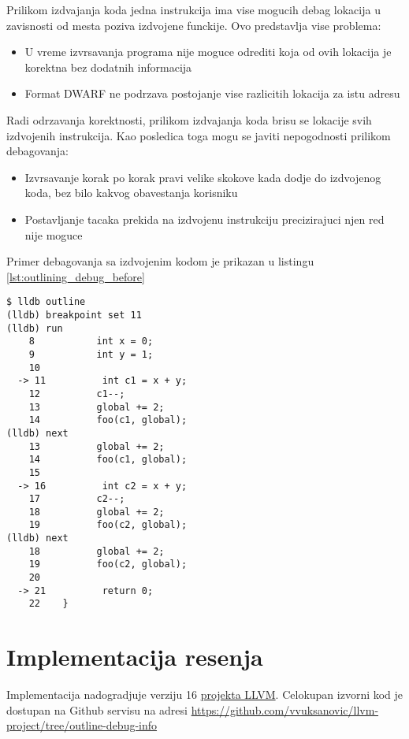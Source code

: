 \documentclass[12pt,oneside]{memoir}
\begin{document}
Prilikom izdvajanja koda jedna instrukcija ima vise mogucih debag lokacija u zavisnosti od mesta poziva izdvojene funckije.
Ovo predstavlja vise problema:
\begin{itemize}
  \item U vreme izvrsavanja programa nije moguce odrediti koja od ovih lokacija je korektna bez dodatnih informacija
  \item Format DWARF ne podrzava postojanje vise razlicitih lokacija za istu adresu \cite{dwarf5}
\end{itemize}
Radi odrzavanja korektnosti, prilikom izdvajanja koda brisu se lokacije svih izdvojenih instrukcija.
Kao posledica toga mogu se javiti nepogodnosti prilikom debagovanja:
\begin{itemize}
  \item Izvrsavanje korak po korak pravi velike skokove kada dodje do izdvojenog koda, bez bilo kakvog obavestanja korisniku
  \item Postavljanje tacaka prekida na izdvojenu instrukciju precizirajuci njen red nije moguce
\end{itemize}

Primer debagovanja sa izdvojenim kodom je prikazan u listingu \ref{lst:outlining_debug_before}

\begin{listing}
\begin{verbatim}
$ lldb outline
(lldb) breakpoint set 11
(lldb) run
    8           int x = 0;
    9           int y = 1;
    10          
  -> 11          int c1 = x + y;
    12          c1--;
    13          global += 2;
    14          foo(c1, global);
(lldb) next
    13          global += 2;
    14          foo(c1, global);
    15          
  -> 16          int c2 = x + y;
    17          c2--;
    18          global += 2;
    19          foo(c2, global);
(lldb) next
    18          global += 2;
    19          foo(c2, global);
    20          
  -> 21          return 0;
    22    }
\end{verbatim}
\label{lst:outlining_debug_before}
\end{listing}

\chapter{Implementacija resenja}

Implementacija nadogradjuje verziju 16 \href{https://llvm.org/}{projekta LLVM}.
Celokupan izvorni kod je dostupan na Github servisu na adresi \url{https://github.com/vvuksanovic/llvm-project/tree/outline-debug-info}
\end{document}

